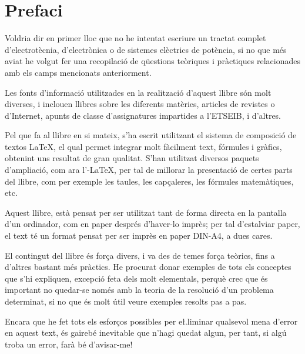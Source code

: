 \chapter*{Prefaci} 

   Voldria dir en primer lloc que no he intentat escriure un tractat complet
   d'electrot\`{e}cnia, d'electr\`{o}nica o de sistemes el\`{e}ctrics de pot\`{e}ncia, si no que m\'{e}s aviat
   he volgut
   fer una recopilaci\'{o} de q\"{u}estions te\`{o}riques i pr\`{a}ctiques relacionades amb els camps mencionats
   anteriorment.

   Les fonts d'informaci\'{o} utilitzades en la realitzaci\'{o} d'aquest llibre s\'{o}n molt diverses,
   i inclouen llibres sobre les diferents mat\`{e}ries, articles de revistes o d'Internet,
   apunts de classe d'assignatures impartides a l'\textsf{ETSEIB}, i d'altres.

   Pel que fa al llibre en si mateix, s'ha escrit utilitzant el sistema de composici\'{o} de
   textos \LaTeX, el qual
   permet integrar molt f\`{a}cilment text, f\'{o}rmules i gr\`{a}fics, obtenint uns resultat de
   gran qualitat. S'han utilitzat diversos paquets d'ampliaci\'{o}, com ara
   l'\AmS-\LaTeX,
   per tal de millorar la presentaci\'{o} de certes parts del
   llibre, com per exemple les taules, les cap\c{c}aleres, les f\'{o}rmules matem\`{a}tiques, etc.

   Aquest llibre, est\`{a} pensat per ser utilitzat tant de forma directa en la pantalla d'un
   ordinador, com en paper despr\'{e}s d'haver-lo impr\`{e}s; per tal d'estalviar paper, el text
   t\'{e} un format pensat per ser impr\`{e}s en paper DIN-A4, a dues cares.

    El contingut del llibre \'{e}s for\c{c}a divers, i va des de temes for\c{c}a te\`{o}rics, fins a
    d'altres bastant m\'{e}s pr\`{a}ctics. He procurat donar exemples de tots els conceptes
    que s'hi expliquen, excepci\'{o} feta dels molt elementals, perqu\`{e} crec que \'{e}s important
     no quedar-se nom\'{e}s amb la teoria de  la resoluci\'{o} d'un problema determinat, si no que
     \'{e}s molt \'{u}til veure exemples resolts pas a pas.

    Encara que he fet tots els esfor\c{c}os possibles per e{\l.l}iminar qualsevol
    mena  d'error en aquest text, \'{e}s gaireb\'{e} inevitable que n'hagi quedat algun,
    per tant, si alg\'{u} troba un error, far\`{a} b\'{e} d'avisar-me!


